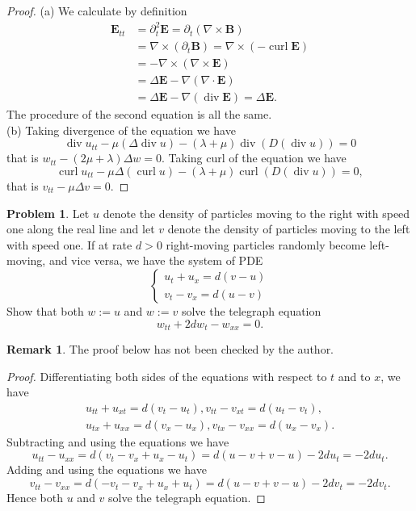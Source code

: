 \documentclass[hyperref,UTF8,12pt]{article}
\numberwithin{equation}{subsection}
\theoremstyle{plain}
\theoremstyle{definition}
\newtheorem{remark}{Remark}
\newtheorem{problem}{Problem}
\numberwithin{theorem}{section}
\numberwithin{lemma}{section}
\numberwithin{proposition}{section}
\numberwithin{remark}{section}
\numberwithin{corollary}{section}
\numberwithin{definition}{section}
\numberwithin{problem}{section}
\numberwithin{example}{section}
\newcommand{\divv}{\operatorname{div}}
\newcommand{\curl}{\operatorname{curl}}
\begin{document}
\begin{proof}
(a) We calculate by definition\[\begin{aligned}
	\mathbf{E}_{tt}&=\partial_t^2\mathbf{E}=\partial_t(\nabla\times\mathbf{B})\\
	&=\nabla\times(\partial_t\mathbf{B})=\nabla\times(-\curl\mathbf{E})\\
	&=-\nabla\times(\nabla\times\mathbf{E})\\
	&=\Delta\mathbf{E}-\nabla(\nabla\cdot\mathbf{E})\\
	&=\Delta\mathbf{E}-\nabla(\divv\mathbf{E})=\Delta\mathbf{E}.
\end{aligned}\]The procedure of the second equation is all the same.\\
(b) Taking divergence of the equation we have
\[\divv u_{t t}-\mu(\Delta\divv u)-(\lambda+\mu)\divv(D(\divv u))=0\]
that is $w_{t t}-(2 \mu+\lambda) \Delta w=0$. Taking curl of the equation we have
\[\curl u_{tt}-\mu \Delta(\curl u)-(\lambda+\mu) \curl(D(\divv u))=0,\]
that is $v_{tt}-\mu\Delta v=0$.
\end{proof}
\begin{problem}
Let $u$ denote the density of particles moving to the right with speed one along the real line and let $v$ denote the density of particles moving to the left with speed one. If at rate $d>0$ right-moving particles randomly become left-moving, and vice versa, we have the system of PDE\[\left\{\begin{array}{l}
	u_t+u_x=d(v-u)\\
	v_t-v_x=d(u-v)
\end{array}\right.\]Show that both $w:=u$ and $w:=v$ solve the telegraph equation\[w_{tt}+2dw_t-w_{xx}=0.\]
\end{problem}
\begin{remark}
The proof below has not been checked by the author.
\end{remark}
\begin{proof}
Differentiating both sides of the equations with respect to $t$ and to $x$, we have
\[\begin{gathered}
	u_{tt}+u_{xt}=d(v_t-u_t),v_{tt}-v_{xt}=d(u_t-v_t),\\
	u_{tx}+u_{xx}=d(v_x-u_x),v_{tx}-v_{xx}=d(u_x-v_x).
\end{gathered}\]Subtracting and using the equations we have
\[u_{tt}-u_{xx}=d(v_t-v_x+u_x-u_t)=d(u-v+v-u)-2du_t=-2du_t.\]
Adding and using the equations we have
\[v_{tt}-v_{xx}=d(-v_t-v_x+u_x+u_t)=d(u-v+v-u)-2dv_t=-2dv_t.\]
Hence both $u$ and $v$ solve the telegraph equation.
\end{proof}
\end{document}
